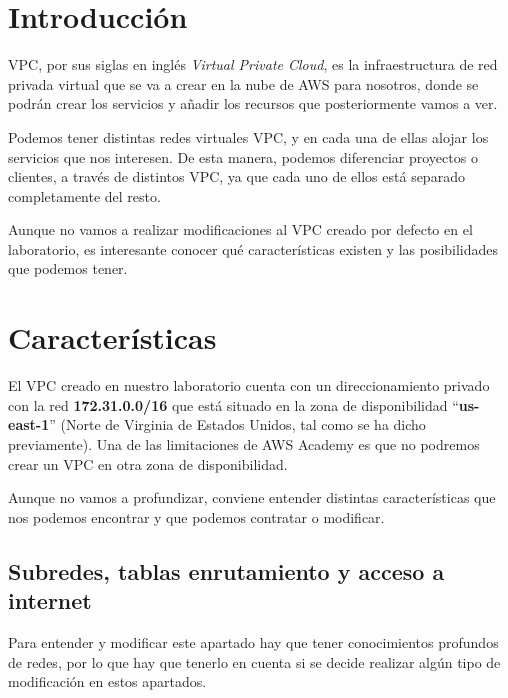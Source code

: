\chapter{Introducción}

VPC, por sus siglas en inglés \textit{Virtual Private Cloud}, es la infraestructura de red privada virtual  que se va a crear en la nube de AWS para nosotros, donde se podrán crear los servicios y añadir los recursos que posteriormente vamos a ver.

Podemos tener distintas redes virtuales VPC, y en cada una de ellas alojar los servicios que nos interesen. De esta manera, podemos diferenciar proyectos o clientes, a través de distintos VPC, ya que cada uno de ellos está separado completamente del resto.

Aunque no vamos a realizar modificaciones al VPC creado por defecto en el laboratorio, es interesante conocer qué características existen y las posibilidades que podemos tener.

\chapter{Características}

El VPC creado en nuestro laboratorio cuenta con un direccionamiento privado con la red \textbf{172.31.0.0/16} que está situado en la zona de disponibilidad “\textbf{us-east-1}” (Norte de Virginia de Estados Unidos, tal como se ha dicho previamente). Una de las limitaciones de AWS Academy es que no podremos crear un VPC en otra zona de disponibilidad.


Aunque no vamos a profundizar, conviene entender distintas características que nos podemos encontrar y que podemos contratar o modificar.


\section{Subredes, tablas enrutamiento y acceso a internet}

Para entender y modificar este apartado hay que tener conocimientos profundos de redes, por lo que hay que tenerlo en cuenta si se decide realizar algún tipo de modificación en estos apartados.


